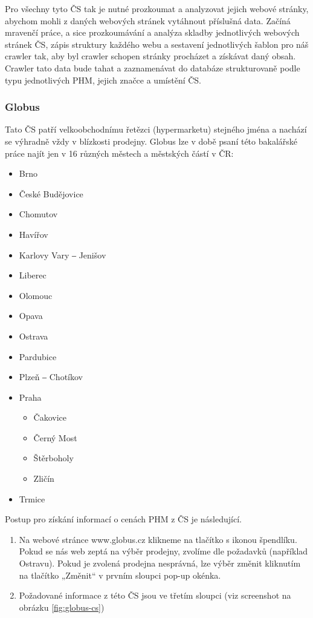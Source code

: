 Pro všechny tyto ČS tak je nutné prozkoumat a analyzovat jejich webové
stránky, abychom mohli z daných webových stránek vytáhnout příslušná data.
Začíná mravenčí práce, a sice prozkoumávání a analýza skladby jednotlivých
webových stránek ČS, zápis struktury každého webu a sestavení jednotlivých
šablon pro náš crawler tak, aby byl crawler schopen stránky procházet
a získávat daný obsah. Crawler tato data bude tahat a zaznamenávat
do databáze strukturovaně podle typu jednotlivých PHM, jejich značce
a umístění ČS.

\subsubsection{Globus}

Tato ČS patří velkoobchodnímu řetězci (hypermarketu) stejného jména
a nachází se výhradně vždy v blízkosti prodejny. Globus lze v době
psaní této bakalářské práce najít jen v 16 různých městech a městských
částí v ČR:

\begin{itemize}
    \item Brno
    \item České Budějovice
    \item Chomutov
    \item Havířov
    \item Karlovy Vary ‒ Jenišov
    \item Liberec
    \item Olomouc
    \item Opava
    \item Ostrava
    \item Pardubice
    \item Plzeň ‒ Chotíkov
    \item Praha
    \begin{itemize}
        \item Čakovice
        \item Černý Most
        \item Štěrboholy
        \item Zličín
    \end{itemize}
    \item Trmice
\end{itemize}

Postup pro získání informací o cenách PHM z ČS je následující.

\begin{enumerate}
    \item Na webové stránce www.globus.cz klikneme na tlačítko s ikonou
        špendlíku. Pokud se nás web zeptá na výběr prodejny, zvolíme
        dle požadavků (například Ostravu). Pokud je zvolená prodejna
        nesprávná, lze výběr změnit kliknutím na tlačítko „Změnit“
        v prvním sloupci pop-up okénka.
    \item Požadované informace z této ČS jsou ve třetím sloupci (viz
        screenshot na obrázku \ref{fig:globus-cs})
\end{enumerate}

